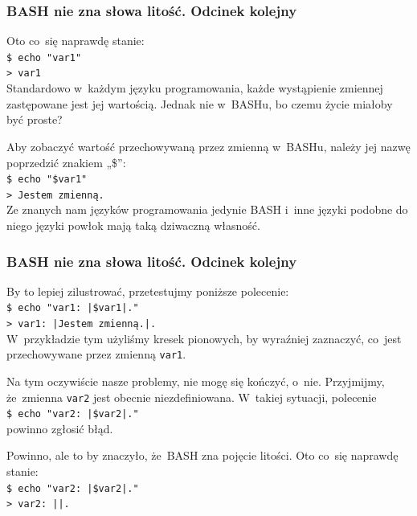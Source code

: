 \documentclass[10pt,t]{beamer}
\begin{document}
\begin{frame}
  \frametitle{BASH nie zna słowa litość. Odcinek kolejny}


  Oto co~się naprawdę stanie: \\
  \texttt{\$ echo "var1"} \\
  \texttt{> var1} \\
  Standardowo w~każdym języku programowania, każde wystąpienie zmiennej
  zastępowane jest jej wartością. Jednak nie w~BASHu, bo czemu życie miałoby
  być proste?

  Aby zobaczyć wartość przechowywaną przez zmienną w~BASHu, należy jej
  nazwę poprzedzić znakiem „\$”: \\
  \texttt{\$ echo "\$var1"} \\
  \texttt{> Jestem zmienną.} \\
  Ze znanych nam języków programowania jedynie BASH i~inne języki podobne do
  niego języki powłok mają taką dziwaczną własność.

\end{frame}





\begin{frame}
  \frametitle{BASH nie zna słowa litość. Odcinek kolejny}


  By to lepiej zilustrować, przetestujmy poniższe polecenie: \\
  \texttt{\$ echo "var1: |\$var1|."} \\
  \texttt{> var1: |Jestem zmienną.|.} \\
  W~przykładzie tym użyliśmy kresek pionowych, by wyraźniej zaznaczyć,
  co~jest przechowywane przez zmienną \texttt{var1}.

  Na tym oczywiście nasze problemy, nie mogę się kończyć, o~nie. Przyjmijmy,
  że~zmienna \texttt{var2} jest obecnie niezdefiniowana. W~takiej sytuacji,
  polecenie \\
  \texttt{\$ echo "var2: |\$var2|."} \\
  powinno zgłosić błąd.

  Powinno, ale to by znaczyło, że~BASH zna pojęcie litości. Oto co~się
  naprawdę stanie: \\
  \texttt{\$ echo "var2: |\$var2|."} \\
  \texttt{> var2: ||.} \\

\end{frame}
\end{document}
